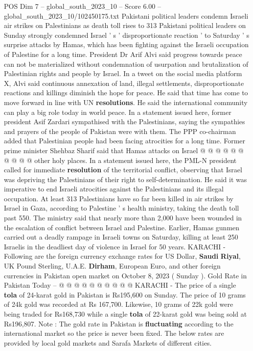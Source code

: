 \begin{textsample}{POS Dim 7 – global\_south\_2023\_10 – Score 6.00 – global\_south\_2023\_10/102450175.txt}  \label{ex:f7_pos_132}
Pakistani political leaders condemn Israeli air strikes on Palestinians as death toll rises to 313 Pakistani political leaders on Sunday strongly condemned Israel ' s ' disproportionate reaction ' to Saturday ' s surprise attacks by Hamas, which has been fighting against the Israeli occupation of Palestine for a long time.
President Dr Arif Alvi said progress towards peace can not be materialized without condemnation of usurpation and brutalization of Palestinian rights and people by Israel.
In a tweet on the social media platform X, Alvi said continuous annexation of land, illegal settlements, disproportionate reactions and killings diminish the hope for peace.
He said that time has come to move forward in line with UN \textbf{resolutions}.
He said the international community can play a big role today in world peace.
In a statement issued here, former president Asif Zardari sympathised with the Palestinians, saying the sympathies and prayers of the people of Pakistan were with them.
The PPP co-chairman added that Palestinian people had been facing atrocities for a long time.
Former prime minister Shehbaz Sharif said that Hamas attacks on Israel @ @ @ @ @ @ @ @ @ @ other holy places.
In a statement issued here, the PML-N president called for immediate \textbf{resolution} of the territorial conflict, observing that Israel was depriving the Palestinians of their right to self-determination.
He said it was imperative to end Israeli atrocities against the Palestinians and its illegal occupation.
At least 313 Palestinians have so far been killed in air strikes by Israel in Gaza, according to Palestine ' s health ministry, taking the death toll past 550.
The ministry said that nearly more than 2,000 have been wounded in the escalation of conflict between Israel and Palestine.
Earlier, Hamas gunmen carried out a deadly rampage in Israeli towns on Saturday, killing at least 250 Israelis in the deadliest day of violence in Israel for 50 years.
KARACHI - Following are the foreign currency exchange rates for US Dollar, \textbf{Saudi} \textbf{Riyal}, UK Pound Sterling, U.A.E. \textbf{Dirham}, European Euro, and other foreign currencies in Pakistan open market on October 8, 2023 ( Sunday ).
Gold Rate in Pakistan Today -- @ @ @ @ @ @ @ @ @ @ KARACHI - The price of a single \textbf{tola} of 24-karat gold in Pakistan is Rs195,600 on Sunday.
The price of 10 grams of 24k gold was recorded at Rs 167,700.
Likewise, 10 grams of 22k gold were being traded for Rs168,730 while a single \textbf{tola} of 22-karat gold was being sold at Rs196,807.
Note : The gold rate in Pakistan is \textbf{fluctuating} according to the international market so the price is never been fixed.
The below rates are provided by local gold markets and Sarafa Markets of different cities.

\end{textsample}
